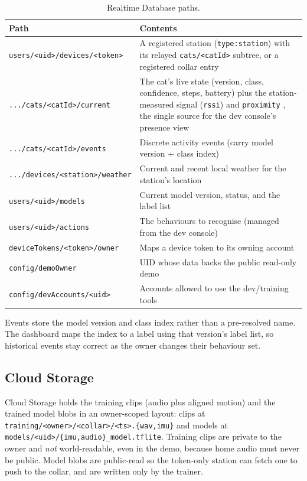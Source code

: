 \begin{table}[ht]
  \centering
  \caption{Realtime Database paths.}
  \label{tab:db}
  \begin{tabularx}{\textwidth}{@{}lX@{}}
    \toprule
    \textbf{Path} & \textbf{Contents} \\
    \midrule
    \texttt{users/<uid>/devices/<token>}        & A registered station (\texttt{type:station}) with its
      relayed \texttt{cats/<catId>} subtree, or a registered collar entry \\
    \texttt{.../cats/<catId>/current}           & The cat's live state (version, class, confidence, steps, battery) plus the station-measured signal (\texttt{rssi}) and \texttt{proximity} , the single source for the dev console's presence view \\
    \texttt{.../cats/<catId>/events}            & Discrete activity events (carry model version + class index) \\
    \texttt{.../devices/<station>/weather}      & Current and recent local weather for the station's location \\
    \texttt{users/<uid>/models}                 & Current model version, status, and the label list \\
    \texttt{users/<uid>/actions}                & The behaviours to recognise (managed from the dev console) \\
    \texttt{deviceTokens/<token>/owner}         & Maps a device token to its owning account \\
    \texttt{config/demoOwner}                   & UID whose data backs the public read-only demo \\
    \texttt{config/devAccounts/<uid>}           & Accounts allowed to use the dev/training tools \\
    \bottomrule
  \end{tabularx}
\end{table}

Events store the model version and class index rather than a pre-resolved name. The dashboard maps the
index to a label using that version's label list, so historical events stay correct as the owner
changes their behaviour set.

\subsection{Cloud Storage}

Cloud Storage holds the training clips (audio plus aligned motion) and the trained model blobs in an
owner-scoped layout: clips at \texttt{training/<owner>/\allowbreak <collar>/<ts>.\{wav,imu\}} and models
at \texttt{models/<uid>/\allowbreak \{imu,audio\}\_model.tflite}. Training clips are private to the owner
and \emph{not} world-readable, even in the demo, because home audio must never be public. Model blobs
are public-read so the token-only station can fetch one to push to the collar, and are written only by
the trainer.

